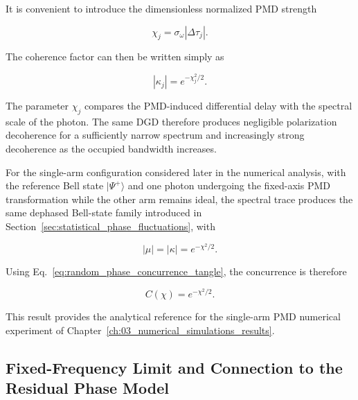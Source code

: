 It is convenient to introduce the dimensionless normalized PMD strength

\begin{equation}
\boxed{
\chi_j
=
\sigma_\omega |\Delta\tau_j|.
}
\label{eq:normalized_pmd_parameter}
\end{equation}

The coherence factor can then be written simply as

\begin{equation}
\boxed{
|\kappa_j|
=
e^{-\chi_j^2/2}.
}
\label{eq:gaussian_pmd_coherence_normalized}
\end{equation}

The parameter \(\chi_j\) compares the PMD-induced differential delay with the
spectral scale of the photon. The same DGD therefore produces negligible
polarization decoherence for a sufficiently narrow spectrum and increasingly
strong decoherence as the occupied bandwidth increases.

For the single-arm configuration considered later in the numerical analysis,
with the reference Bell state \( |\Psi^+\rangle \) and one photon undergoing the
fixed-axis PMD transformation while the other arm remains ideal, the spectral
trace produces the same dephased Bell-state family introduced in
Section~\ref{sec:statistical_phase_fluctuations}, with

\begin{equation}
|\mu|
=
|\kappa|
=
e^{-\chi^2/2}.
\label{eq:single_arm_pmd_effective_coherence}
\end{equation}

Using Eq.~\eqref{eq:random_phase_concurrence_tangle}, the concurrence is therefore

\begin{equation}
\boxed{
C(\chi)
=
e^{-\chi^2/2}.
}
\label{eq:single_arm_pmd_concurrence_analytical}
\end{equation}

This result provides the analytical reference for the single-arm PMD numerical
experiment of Chapter~\ref{ch:03_numerical_simulations_results}.


\subsection{Fixed-Frequency Limit and Connection to the Residual Phase Model}
\label{subsec:fixed_frequency_birefringence_residual_phase}

